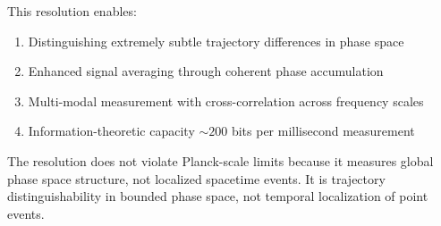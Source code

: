 This resolution enables:
\begin{enumerate}
\item Distinguishing extremely subtle trajectory differences in phase space
\item Enhanced signal averaging through coherent phase accumulation
\item Multi-modal measurement with cross-correlation across frequency scales
\item Information-theoretic capacity $\sim 200$ bits per millisecond measurement
\end{enumerate}

The resolution does not violate Planck-scale limits because it measures global phase space structure, not localized spacetime events. It is trajectory distinguishability in bounded phase space, not temporal localization of point events.
